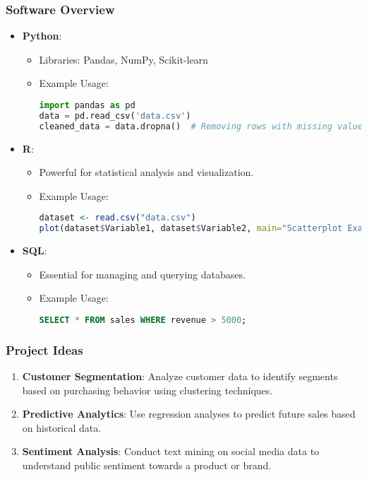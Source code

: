 \documentclass{beamer}
\begin{document}
\begin{frame}[fragile]
    \frametitle{Software Overview}
    \begin{itemize}
        \item \textbf{Python}:
        \begin{itemize}
            \item Libraries: Pandas, NumPy, Scikit-learn
            \item Example Usage:
            \begin{lstlisting}[language=Python]
import pandas as pd
data = pd.read_csv('data.csv')
cleaned_data = data.dropna()  # Removing rows with missing values
            \end{lstlisting}
        \end{itemize}
        
        \item \textbf{R}:
        \begin{itemize}
            \item Powerful for statistical analysis and visualization.
            \item Example Usage:
            \begin{lstlisting}[language=R]
dataset <- read.csv("data.csv")
plot(dataset$Variable1, dataset$Variable2, main="Scatterplot Example")
            \end{lstlisting}
        \end{itemize}

        \item \textbf{SQL}:
        \begin{itemize}
            \item Essential for managing and querying databases.
            \item Example Usage:
            \begin{lstlisting}[language=SQL]
SELECT * FROM sales WHERE revenue > 5000;
            \end{lstlisting}
        \end{itemize}
    \end{itemize}
\end{frame}

\begin{frame}[fragile]
    \frametitle{Project Ideas}
    \begin{enumerate}
        \item \textbf{Customer Segmentation}: Analyze customer data to identify segments based on purchasing behavior using clustering techniques.
        \item \textbf{Predictive Analytics}: Use regression analyses to predict future sales based on historical data.
        \item \textbf{Sentiment Analysis}: Conduct text mining on social media data to understand public sentiment towards a product or brand.
    \end{enumerate}
\end{frame}
\end{document}

